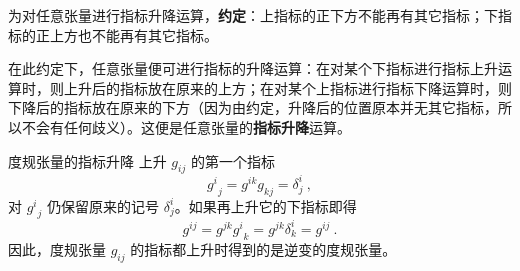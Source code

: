 为对任意张量进行指标升降运算，\textbf{约定}：上指标的正下方不能再有其它指标；下指标的正上方也不能再有其它指标。

在此约定下，任意张量便可进行指标的升降运算：在对某个下指标进行指标上升运算时，则上升后的指标放在原来的上方；在对某个上指标进行指标下降运算时，则下降后的指标放在原来的下方（因为由约定，升降后的位置原本并无其它指标，所以不会有任何歧义）。这便是任意张量的\textbf{指标升降}运算。

\begin{example}{度规张量的指标升降}
上升 $g_{ij}$ 的第一个指标
\begin{equation}
{g^{i}}_{j}=g^{ik} g_{kj}=\delta^i_j~,
\end{equation}
对 ${g^i}_j$ 仍保留原来的记号 $\delta^i_j$。如果再上升它的下指标即得
\begin{equation}
g^{ij}=g^{jk}{g^i}_k=g^{jk}\delta^i_k=g^{ij}~.
\end{equation}
因此，度规张量 $g_{ij}$ 的指标都上升时得到的是逆变的度规张量。
\end{example}